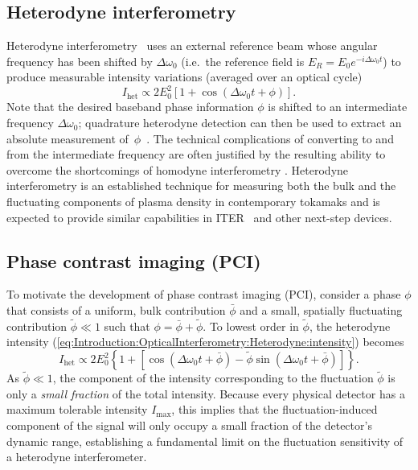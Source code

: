 \subsection{Heterodyne interferometry}
Heterodyne interferometry~\cite{hutchinson_diagnostics}
uses an external reference beam
whose angular frequency has been shifted by $\Delta \omega_0$
(i.e.\ the reference field is $E_R = E_0 e^{-i \Delta \omega_0 t}$)
to produce measurable intensity variations (averaged over an optical cycle)
\begin{equation}
  I_{\text{het}}
  \propto
  2E_0^2 \left[
    1 + \cos \left(\Delta \omega_0 t + \phi \right)
  \right].
  \label{eq:Introduction:OpticalInterferometry:Heterodyne:intensity}
\end{equation}
Note that the desired baseband phase information $\phi$ is shifted
to an intermediate frequency $\Delta \omega_0$;
quadrature heterodyne detection can then be used
to extract an absolute measurement of~$\phi$~\cite{carlstrom_rsi88}.
The technical complications of converting to and from
the intermediate frequency
are often justified by the resulting ability
to overcome the shortcomings of homodyne interferometry
\cite{hutchinson_diagnostics, nazikian_rsi87}.
Heterodyne interferometry is an established technique
for measuring both the bulk and the fluctuating components of plasma density
in contemporary tokamaks
\cite{carlstrom_rsi88, vanzeeland_ppcf05, mlynek_fst12, kasten_rsi12}
and is expected to provide similar capabilities
in ITER~\cite{vanzeeland_TIP_rsi13} and other next-step devices.


\subsection{Phase contrast imaging (PCI)}
\label{sec:Introduction:OpticalInterferometry:pci}
To motivate the development of phase contrast imaging (PCI),
consider a phase $\phi$ that consists of a
uniform, bulk contribution $\bar{\phi}$ and
a small, spatially fluctuating contribution $\tilde{\phi} \ll 1$ such that
$\phi = \bar{\phi} + \tilde{\phi}$.
To lowest order in $\tilde{\phi}$,
the heterodyne intensity
(\ref{eq:Introduction:OpticalInterferometry:Heterodyne:intensity})
becomes
\begin{equation}
  I_{\text{het}}
  \propto
  2 E_0^2 \left\{
    1
    +
    \left[
      \cos \left(\Delta \omega_0 t + \bar{\phi} \right)
      -
      \tilde{\phi} \sin \left( \Delta \omega_0 t + \bar{\phi} \right)
    \right]
  \right\}.
\end{equation}
As $\tilde{\phi} \ll 1$,
the component of the intensity
corresponding to the fluctuation $\tilde{\phi}$
is only a \emph{small fraction} of the total intensity.
Because every physical detector
has a maximum tolerable intensity $I_{\text{max}}$,
this implies that the fluctuation-induced component of the signal
will only occupy a small fraction
of the detector's dynamic range,
establishing a fundamental limit
on the fluctuation sensitivity of a heterodyne interferometer.

